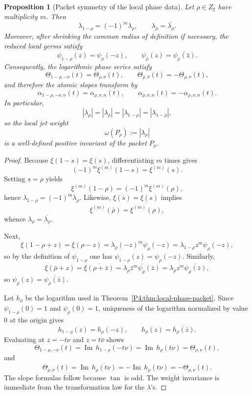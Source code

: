 \documentclass[11pt,a4paper]{article}
\numberwithin{equation}{section}
\newtheorem{proposition}[theorem]{Proposition}
\theoremstyle{definition}
\theoremstyle{remark}
\DeclareMathOperator{\Ima}{Im}
\begin{document}
\begin{proposition}[Packet symmetry of the local phase data]\label{P4:prop:packet-symmetry-local}
Let $\rho\in Z_\xi$ have multiplicity $m$.  Then
\[
\lambda_{1-\rho}=(-1)^m\lambda_\rho,
\qquad
\lambda_{\bar\rho}=\overline{\lambda_\rho}.
\]
Moreover, after shrinking the common radius of definition if necessary, the reduced local germs satisfy
\[
\psi_{1-\rho}(z)=\psi_\rho(-z),
\qquad
\psi_{\bar\rho}(z)=\overline{\psi_\rho(\bar z)}.
\]
Consequently, the logarithmic phase series satisfy
\[
\Theta_{1-\rho,-\nu}(t)=\Theta_{\rho,\nu}(t),
\qquad
\Theta_{\bar\rho,\bar\nu}(t)=-\Theta_{\rho,\nu}(t),
\]
and therefore the atomic slopes transform by
\[
\alpha_{1-\rho,-\nu,n}(t)=\alpha_{\rho,\nu,n}(t),
\qquad
\alpha_{\bar\rho,\bar\nu,n}(t)=-\alpha_{\rho,\nu,n}(t).
\]
In particular,
\[
|\lambda_{\rho}|=|\lambda_{\bar\rho}|=|\lambda_{1-\rho}|=|\lambda_{1-\bar\rho}|,
\]
so the local jet weight
\[
\omega(P_\rho):=|\lambda_\rho|
\]
is a well-defined positive invariant of the packet $P_\rho$.
\end{proposition}

\begin{proof}
Because $\xi(1-s)=\xi(s)$, differentiating $m$ times gives
\[
(-1)^m\xi^{(m)}(1-s)=\xi^{(m)}(s).
\]
Setting $s=\rho$ yields
\[
\xi^{(m)}(1-\rho)=(-1)^m\xi^{(m)}(\rho),
\]
hence $\lambda_{1-\rho}=(-1)^m\lambda_\rho$.  Likewise, $\overline{\xi(\bar s)}=\xi(s)$ implies
\[
\xi^{(m)}(\bar\rho)=\overline{\xi^{(m)}(\rho)},
\]
whence $\lambda_{\bar\rho}=\overline{\lambda_\rho}$.

Next,
\[
\xi(1-\rho+z)=\xi(\rho-z)=\lambda_\rho(-z)^m\psi_\rho(-z)=\lambda_{1-\rho} z^m\psi_\rho(-z),
\]
so by the definition of $\psi_{1-\rho}$ one has $\psi_{1-\rho}(z)=\psi_\rho(-z)$.  Similarly,
\[
\xi(\bar\rho+z)=\overline{\xi(\rho+\bar z)}
=\overline{\lambda_\rho \bar z^m \psi_\rho(\bar z)}
=\lambda_{\bar\rho} z^m\overline{\psi_\rho(\bar z)},
\]
so $\psi_{\bar\rho}(z)=\overline{\psi_\rho(\bar z)}$.

Let $h_\rho$ be the logarithm used in Theorem~\ref{P4:thm:local-phase-packet}.  Since $\psi_{1-\rho}(0)=1$ and $\psi_\rho(0)=1$, uniqueness of the logarithm normalized by value $0$ at the origin gives
\[
h_{1-\rho}(z)=h_\rho(-z),
\qquad
h_{\bar\rho}(z)=\overline{h_\rho(\bar z)}.
\]
Evaluating at $z=-t\nu$ and $z=t\bar\nu$ shows
\[
\Theta_{1-\rho,-\nu}(t)=\Ima\,h_{1-\rho}(-t\nu)=\Ima\,h_\rho(t\nu)=\Theta_{\rho,\nu}(t),
\]
and
\[
\Theta_{\bar\rho,\bar\nu}(t)=\Ima\,\overline{h_\rho(t\nu)}=-\Ima\,h_\rho(t\nu)=-\Theta_{\rho,\nu}(t).
\]
The slope formulas follow because $\tan$ is odd.  The weight invariance is immediate from the transformation law for the $\lambda$'s.
\end{proof}
\end{document}

